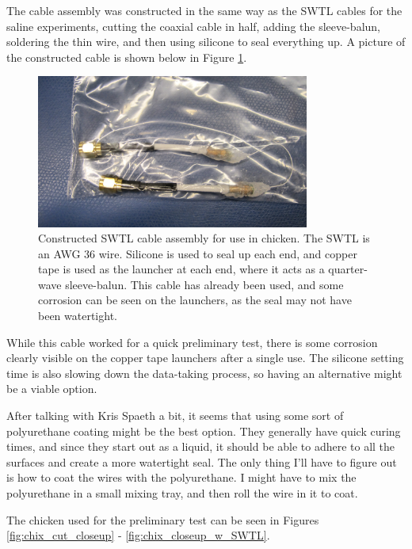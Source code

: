 \documentclass[12pt,onecolumn,titlepage]{article}
\begin{document}
The cable assembly was constructed in the same way as	 the SWTL cables for the saline experiments, cutting the coaxial cable in half, adding the sleeve-balun, soldering the thin wire, and then using silicone to seal everything up. A picture of the constructed cable is shown below in Figure \ref{fig:AWG36_cable}.




\begin{figure}[htbp]
	\centering
	\includegraphics[width=0.8\textwidth]{Pictures/18Aug2013/AWG36_cable}
	\caption{ Constructed SWTL cable assembly for use in chicken. The SWTL is an AWG 36 wire. Silicone is used to seal up each end, and copper tape is used as the launcher at each end, where it acts as a quarter-wave sleeve-balun. This cable has already been used, and some corrosion can be seen on the launchers, as the seal may not have been watertight. } 
	\label{fig:AWG36_cable}
\end{figure}


While this cable worked for a quick preliminary test, there is some corrosion clearly visible on the copper tape launchers after a single use. The silicone setting time is also slowing down the data-taking process, so having an alternative might be a viable option.

After talking with Kris Spaeth a bit, it seems that using some sort of polyurethane coating might be the best option. They generally have quick curing times, and since they start out as a liquid, it should be able to adhere to all the surfaces and create a more watertight seal. The only thing I'll have to figure out is how to coat the wires with the polyurethane. I might have to mix the polyurethane in a small mixing tray, and then roll the wire in it to coat. 



The chicken used for the preliminary test can be seen in Figures \ref{fig:chix_cut_closeup} - \ref{fig:chix_closeup_w_SWTL}. 
\end{document}
